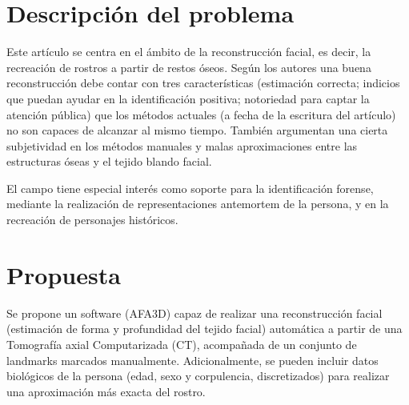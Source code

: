 \documentclass[13pt,a4paper]{article}
\begin{document}
    
    

    \newpage


\section{Descripción del problema}
Este artículo se centra en el ámbito de la reconstrucción facial, es decir, la recreación de rostros a partir de restos óseos. Según los autores una buena reconstrucción debe contar con tres características (estimación correcta; indicios que puedan ayudar en la identificación positiva; notoriedad para captar la atención pública) que los métodos actuales (a fecha de la escritura del artículo) no son capaces de alcanzar al mismo tiempo. También argumentan una cierta subjetividad en los métodos manuales y malas aproximaciones entre las estructuras óseas y el tejido blando facial.

El campo tiene especial interés como soporte para la identificación forense, mediante la realización de representaciones antemortem de la persona, y en la recreación de personajes históricos.

\section{Propuesta}



Se propone un software (AFA3D) capaz de realizar una reconstrucción facial (estimación de forma y profundidad del tejido facial) automática a partir de una Tomografía axial Computarizada (CT), acompañada de un conjunto de landmarks marcados manualmente. Adicionalmente, se pueden incluir datos biológicos de la persona (edad, sexo y corpulencia, discretizados) para realizar una aproximación más exacta del rostro.
\end{document}
